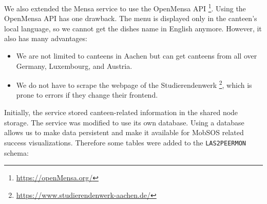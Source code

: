 We also extended the Mensa service to use the OpenMensa API \footnote{\url{https://openMensa.org/}}. 
Using the OpenMensa API has one drawback. The menu is displayed only in the canteen's local language, so we cannot get the dishes name in English anymore.
However, it also has many advantages:
\begin{itemize}
    \item We are not limited to canteens in Aachen but can get canteens from all over Germany, Luxembourg, and Austria. 
    \item We do not have to scrape the webpage of the Studierendenwerk \footnote{\url{https://www.studierendenwerk-aachen.de/}}, which is prone to errors if they change their frontend.
\end{itemize}
Initially, the service stored canteen-related information in the shared node storage. The service was modified to use its own database. Using a database allows us to make data persistent and make it available for MobSOS related success visualizations. 
Therefore some tables were added to the \texttt{LAS2PEERMON} schema:
